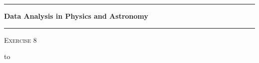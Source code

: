 \documentclass{article}
\begin{document}
\begin{titlepage}
	\centering
	\vspace*{\fill}
	\LARGE \scshape
	
	\rule{\linewidth}{1pt}
	\Huge \bfseries Data Analysis in Physics and Astronomy \\[-1.5ex]

	\rule{\linewidth}{1pt}
	\vfill
	\vfill
	\LARGE \scshape
	Exercise 8 \\
    \Large \normalfont
	\begin{tabu} to \linewidth {X[c]X[c]X[c]}\\
			\vspace{1cm}\\
		 \\
		 \\
		\vspace{2cm}\\
	\end{tabu}
	\vfill
	\vfill
	\vfill
	\vfill
\end{titlepage}

\setcounter{page}{2}
\newpage
{}%



%

\end{document}
